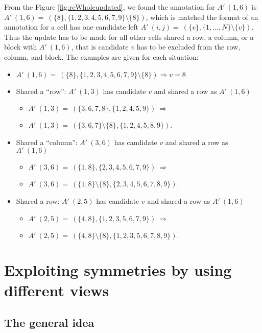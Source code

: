 \documentclass[11pt]{report}
\newcommand{\set}[1]{\{ #1 \}}
\begin{document}
From the Figure \ref{fig:rcWholeupdated}, we found the annotation for $A'\ (1,6)$ is $A'\ (1,6) =\ (\set{8}, \set{1, 2, 3, 4, 5, 6, 7, 9} \setminus \set{8})$, which is matched the format of an annotation for a cell has one candidate left $A'\ (i,j) =\ (\set{v}, \set{1,\dots,N} \setminus \set{v})$. Thus the update has to be made for all other cells shared a row, a column, or a block with $A'\ (1,6)$, that is candidate $v$ has to be excluded from the row, column, and block. The examples are given for each situation:
\begin{itemize}
\item $A'\ (1,6) =\ (\set{8}, \set{1, 2, 3, 4, 5, 6, 7, 9} \setminus \set{8}) \Rightarrow v = 8$
\item Shared a ``row'': $A'\ (1,3)$ has candidate $v$ and shared a row as $A'\ (1,6)$
\begin{itemize}
\item $A'\ (1,3) =\ (\set{3, 6, 7, 8}, \set{1, 2, 4, 5, 9})\ \Rightarrow$
\item  $A'\ (1,3) =\ (\set{3, 6, 7}\setminus \set{8}, \set{1, 2, 4, 5, 8, 9})$.
\end{itemize}
\item Shared a ``column'': $A'\ (3,6)$ has candidate $v$ and shared a row as $A'\ (1,6)$
\begin{itemize}
\item $A'\ (3,6) =\ (\set{1, 8}, \set{2, 3, 4, 5, 6, 7, 9})\ \Rightarrow$
\item $A'\ (3,6) =\ (\set{1, 8}\setminus \set{8}, \set{2, 3, 4, 5, 6, 7, 8, 9})$.
\end{itemize}
\item Shared a row: $A'\ (2,5)$ has candidate $v$ and shared a row as $A'\ (1,6)$
\begin{itemize}
\item $A'\ (2,5) =\ (\set{4, 8}, \set{1, 2, 3, 5, 6, 7, 9})\ \Rightarrow$
\item $A'\ (2,5) =\ (\set{4, 8}\setminus \set{8}, \set{1, 2, 3, 5, 6, 7, 8, 9})$.
\end{itemize}
\end{itemize}


\chapter{Exploiting symmetries by using different views}
\label{cha:exploitingsymm}


\section{The general idea}
\label{sec:diffviewsidea}
\end{document}
